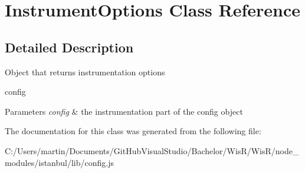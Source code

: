 \hypertarget{class_instrument_options}{}\section{Instrument\+Options Class Reference}
\label{class_instrument_options}


\subsection{Detailed Description}
Object that returns instrumentation options

config  
\begin{DoxyParams}{Parameters}
{\em config} & the instrumentation part of the config object \\
\hline
\end{DoxyParams}


The documentation for this class was generated from the following file\+:\begin{DoxyCompactItemize}
\item 
C\+:/\+Users/martin/\+Documents/\+Git\+Hub\+Visual\+Studio/\+Bachelor/\+Wis\+R/\+Wis\+R/node\+\_\+modules/istanbul/lib/config.\+js\end{DoxyCompactItemize}

